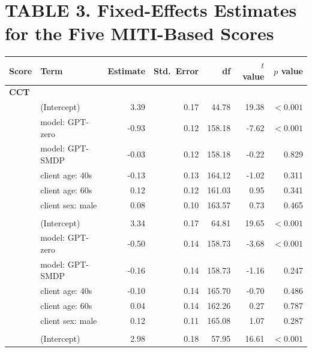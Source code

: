 \documentclass{wiley-article}
\begin{document}
\begin{table}[H] %
  \section*{TABLE 3. Fixed-Effects Estimates for the Five MITI-Based Scores}
  \centering
  \footnotesize
  \begin{threeparttable}
    \label{tab:miti_fixed_effects}
    \begin{tabular}{llrrrrr}
      \toprule
      \textbf{Score} & \textbf{Term} & \textbf{Estimate} & \textbf{Std.\ Error} & \textbf{df} & \textbf{$t$ value} & \textbf{$p$ value} \\
      \midrule
      \multicolumn{7}{l}{\textbf{CCT}}\\
        & (Intercept)                       &  3.39 & 0.17 &  44.78 &  19.38 & $<\!0.001$ \\
        & model: GPT-zero                   & -0.93 & 0.12 & 158.18 &  -7.62 & $<\!0.001$ \\
        & model: GPT-SMDP                  & -0.03 & 0.12 & 158.18 &  -0.22 & 0.829 \\
        & client age: 40s                  & -0.13 & 0.13 & 164.12 &  -1.02 & 0.311 \\
        & client age: 60s                  &  0.12 & 0.12 & 161.03 &   0.95 & 0.341 \\
        & client sex: male                 &  0.08 & 0.10 & 163.57 &   0.73 & 0.465 \\
      \addlinespace
      \multicolumn{7}{l}{\textbf{SST}}\\
        & (Intercept)                       &  3.34 & 0.17 &  64.81 &  19.65 & $<\!0.001$ \\
        & model: GPT-zero                   & -0.50 & 0.14 & 158.73 &  -3.68 & $<\!0.001$ \\
        & model: GPT-SMDP                  & -0.16 & 0.14 & 158.73 &  -1.16 & 0.247 \\
        & client age: 40s                  & -0.10 & 0.14 & 165.70 &  -0.70 & 0.486 \\
        & client age: 60s                  &  0.04 & 0.14 & 162.26 &   0.27 & 0.787 \\
        & client sex: male                 &  0.12 & 0.11 & 165.08 &   1.07 & 0.287 \\
      \addlinespace
      \multicolumn{7}{l}{\textbf{PAR}}\\
        & (Intercept)                       &  2.98 & 0.18 &  57.95 &  16.61 & $<\!0.001$ \\

\end{tabular}
\end{threeparttable}
\end{table}
\end{document}
